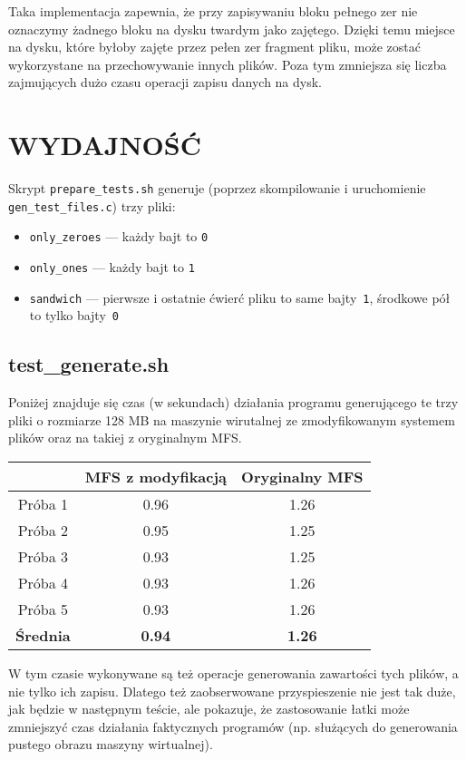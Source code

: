 \documentclass{sig-alternate-05-2015}
\begin{document}
Taka implementacja zapewnia, że przy zapisywaniu bloku pełnego zer nie oznaczymy żadnego bloku na dysku twardym jako zajętego.
Dzięki temu miejsce na dysku, które byłoby zajęte przez pełen zer fragment pliku, może zostać wykorzystane na przechowywanie innych plików.
Poza tym zmniejsza się liczba zajmujących dużo czasu operacji zapisu danych na dysk.

\vfill\null

\section{WYDAJNOŚĆ}
Skrypt \texttt{prepare\_tests.sh} generuje (poprzez skompilowanie i uruchomienie \texttt{gen\_test\_files.c}) trzy pliki:
\begin{itemize}
    \item \texttt{only\_zeroes} --- każdy bajt to \texttt{0}
    \item \texttt{only\_ones} --- każdy bajt to \texttt{1}
    \item \texttt{sandwich} --- pierwsze i ostatnie ćwierć pliku to same bajty~\texttt{1}, środkowe pół to tylko bajty~\texttt{0}
\end{itemize}

\subsection{test\_generate.sh}
Poniżej znajduje się czas (w sekundach) działania programu generującego te trzy pliki o rozmiarze 128 MB na maszynie wirutalnej ze zmodyfikowanym systemem plików oraz na takiej z oryginalnym MFS.
\begin{center}\begin{tabular}{|c|c|c|}
    \hline
     & \textbf{MFS z modyfikacją} & \textbf{Oryginalny MFS}\\
    \hline
    Próba 1 & 0.96 & 1.26 \\
    \hline
    Próba 2 & 0.95 & 1.25 \\
    \hline
    Próba 3 & 0.93 & 1.25 \\
    \hline
    Próba 4 & 0.93 & 1.26 \\
    \hline
    Próba 5 & 0.93 & 1.26 \\
    \hline
    \textbf{Średnia} & \textbf{0.94} & \textbf{1.26} \\
    \hline
\end{tabular}\end{center}
W tym czasie wykonywane są też operacje generowania zawartości tych plików, a nie tylko ich zapisu.
Dlatego też zaobserwowane przyspieszenie nie jest tak duże, jak będzie w następnym teście, ale pokazuje, że zastosowanie łatki może zmniejszyć czas działania faktycznych programów (np. służących do generowania pustego obrazu maszyny wirtualnej).
\end{document}

